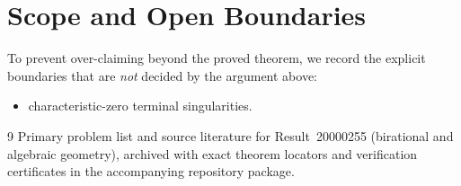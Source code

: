 \documentclass[10pt,reqno]{amsart}
\theoremstyle{definition}
\begin{document}
\section{Scope and Open Boundaries}

To prevent over-claiming beyond the proved theorem, we record the explicit boundaries that are \emph{not} decided by the argument above:
\begin{itemize}
  \item characteristic-zero terminal singularities.
\end{itemize}

\begin{thebibliography}{9}
Primary problem list and source literature for Result~20000255 (birational and algebraic geometry), archived with exact theorem locators and verification certificates in the accompanying repository package.
\end{thebibliography}
\end{document}
